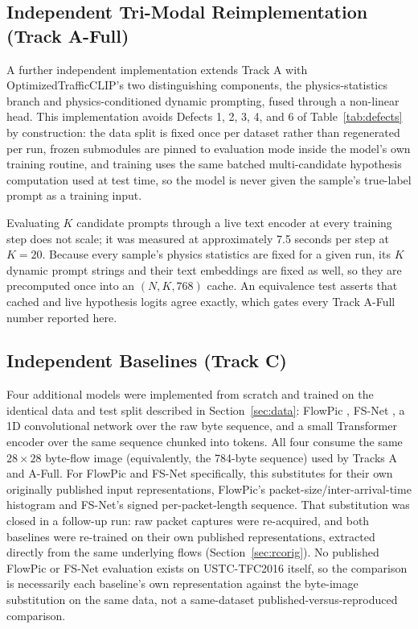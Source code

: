 \documentclass[journal]{IEEEtran}
\begin{document}
\subsection{Independent Tri-Modal Reimplementation (Track A-Full)}
A further independent implementation extends Track A with OptimizedTrafficCLIP's two distinguishing components, the physics-statistics branch and physics-conditioned dynamic prompting, fused through a non-linear head. This implementation avoids Defects 1, 2, 3, 4, and 6 of Table~\ref{tab:defects} by construction: the data split is fixed once per dataset rather than regenerated per run, frozen submodules are pinned to evaluation mode inside the model's own training routine, and training uses the same batched multi-candidate hypothesis computation used at test time, so the model is never given the sample's true-label prompt as a training input.

Evaluating $K$ candidate prompts through a live text encoder at every training step does not scale; it was measured at approximately 7.5 seconds per step at $K=20$. Because every sample's physics statistics are fixed for a given run, its $K$ dynamic prompt strings and their text embeddings are fixed as well, so they are precomputed once into an $(N, K, 768)$ cache. An equivalence test asserts that cached and live hypothesis logits agree exactly, which gates every Track A-Full number reported here.

\subsection{Independent Baselines (Track C)}\label{sec:mc}
Four additional models were implemented from scratch and trained on the identical data and test split described in Section~\ref{sec:data}: FlowPic \cite{flowpic}, FS-Net \cite{fsnet}, a 1D convolutional network over the raw byte sequence, and a small Transformer encoder over the same sequence chunked into tokens. All four consume the same $28 \times 28$ byte-flow image (equivalently, the 784-byte sequence) used by Tracks A and A-Full. For FlowPic and FS-Net specifically, this substitutes for their own originally published input representations, FlowPic's packet-size/inter-arrival-time histogram and FS-Net's signed per-packet-length sequence. That substitution was closed in a follow-up run: raw packet captures were re-acquired, and both baselines were re-trained on their own published representations, extracted directly from the same underlying flows (Section~\ref{sec:rcorig}). No published FlowPic or FS-Net evaluation exists on USTC-TFC2016 itself, so the comparison is necessarily each baseline's own representation against the byte-image substitution on the same data, not a same-dataset published-versus-reproduced comparison.
\end{document}
